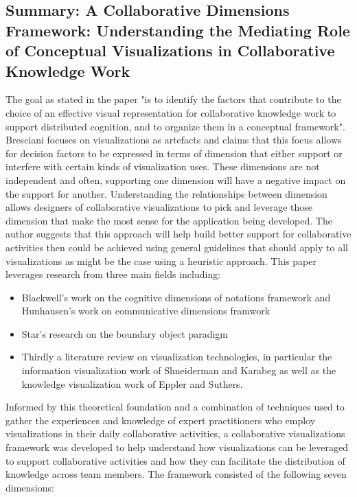 \documentclass{sig-alternate}
\begin{document}
\subsection{Summary: A Collaborative Dimensions Framework: Understanding the Mediating Role of Conceptual Visualizations in Collaborative Knowledge Work}
The goal as stated in the paper "is to identify the factors that contribute to
the choice of an effective visual representation for collaborative knowledge
work to support distributed cognition, and to organize them in a conceptual
framework".  Bresciani  focuses on visualizations as artefacts and claims that
this focus allows for decision factors to be expressed in terms of dimension
that either support  or interfere  with certain kinds of visualization uses.
These dimensions are not independent and often, supporting one dimension will
have a negative impact on the support for another. Understanding the
relationships between dimension allows designers of collaborative visualizations
to pick and leverage those dimension that make the most sense for the
application being developed. The author suggests  that this approach will help
build better support for collaborative activities then could be achieved using
general guidelines that should apply to all visualizations as might be the case
using a heuristic approach. This paper leverages research from three main fields
including:
\begin{itemize}
\item Blackwell's work on the cognitive dimensions of notations framework
\cite{Blackwell:NotationalSystems} and Hunhausen's work on communicative dimensions framwork \cite{Hundhausen:CommunicativeDimensionsFramework}
\item Star's research on the boundary object paradigm \cite{Star:BoundaryObjects} 
\item  Thirdly a literature review on visualization technologies, in particular the information visualization work of Shneiderman and Karabeg as well as the knowledge visualization work of Eppler and Suthers.
\end{itemize}


Informed by  this theoretical foundation and a combination of techniques used to
gather the experiences and knowledge of expert practitioners who employ
visualizations in their daily collaborative activities, a collaborative
visualizations framework was developed to help understand how visualizations can
be leveraged to support collaborative activities and how they can facilitate the
distribution of knowledge across team members. The framework consisted of the
following seven dimensions:
\end{document}
